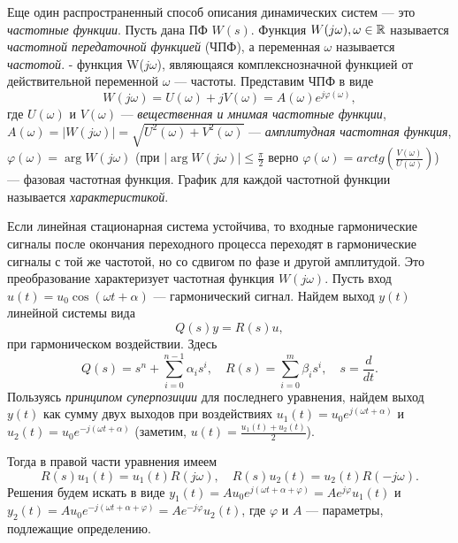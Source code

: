 \documentclass[../../TAU.tex]{subfiles}
\begin{document}
    Еще один распространенный способ описания динамических систем --- это {\it частотные функции}.
    Пусть дана ПФ $W(s)$. Функция 
    $W(j\omega), \omega\in\mathbb{R}$ 
    называется {\it частотной передаточной функцией} (ЧПФ), а переменная $\omega$ называется {\it частотой}.
     - функция W($j\omega$), являющаяся комплекснозначной функцией от действительной переменной $\omega$ --- частоты. 
    Представим ЧПФ в виде
    $$
        W(j\omega) = U(\omega) + jV(\omega) = A(\omega)e^{j\varphi(\omega)},
    $$
    где 
    $U(\omega)$ и $V(\omega)$ 
    --- {\it вещественная и мнимая частотные функции}, 
    ${A(\omega) = |W(j\omega)| = \sqrt{U^2(\omega)+V^2(\omega)}}$ 
    --- {\it амплитудная частотная функция}, 
    ${\varphi(\omega) = \arg{W(j\omega)}}$ (при 
    $|\arg{W(j\omega)}| \le \frac{\pi}{2}$ верно 
    ${\varphi(\omega) = arctg\left(\frac{V(\omega)}{U(\omega)}\right)}$) 
    --- фазовая частотная функция.
    График для каждой частотной функции называется {\it характеристикой}.\par
    Если линейная стационарная система устойчива, то входные гармонические сигналы после окончания переходного процесса переходят в гармонические сигналы с той же частотой, но со сдвигом по фазе и другой амплитудой. Это преобразование характеризует частотная функция 
    $W(j\omega)$.
    Пусть вход 
    ${u(t) = u_0 \cos(\omega t + \alpha)}$ 
    --- гармонический сигнал. Найдем выход $y(t)$ линейной системы вида
    \begin{equation}\label{EQ_ODU_SYM_2}
        Q(s)y = R(s)u,
    \end{equation}
    при гармоническом воздействии. Здесь 
    $$
        {Q(s) = s^n + \sum_{i=0}^{n-1}\alpha_is^i,\quad R(s) = \sum_{i=0}^{m}\beta_is^i, \quad s=\frac{d}{dt}}. 
    $$
    Пользуясь {\it принципом суперпозиции} для последнего уравнения, найдем выход $y(t)$ как сумму двух выходов при воздействиях 
    ${u_1(t) = u_0e^{j(\omega t+\alpha)}}$ и 
    ${u_2(t) = u_0e^{-j(\omega t+\alpha)}}$ (заметим, 
    ${u(t) = \frac{u_1(t)+u_2(t)}{2}}$).\par
    Тогда в правой части уравнения имеем
    $$
        R(s)u_1(t) = u_1(t)R(j\omega),\quad R(s)u_2(t) = u_2(t)R(-j\omega).
    $$
    Решения будем искать в виде ${y_1(t) = A u_0e^{j(\omega t + \alpha + \varphi)} = Ae^{j\varphi}u_1(t)}$ и ${y_2(t) = A u_0e^{-j(\omega t + \alpha + \varphi)} = Ae^{-j\varphi}u_2(t)}$, где ${\varphi}$ и $A$ --- параметры, подлежащие определению.
    \pagebreak
\end{document}
